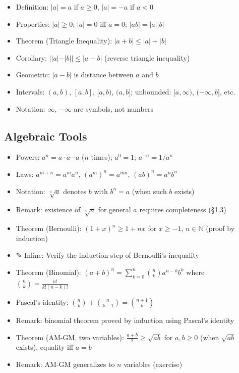 \documentclass[
  10pt,
  letterpaper,
]{scrbook}
\providecommand{\tightlist}{%
  \setlength{\itemsep}{0pt}\setlength{\parskip}{0pt}}
\newcommand{\NN}{\mathbb{N}}
\begin{document}
\begin{itemize}
\tightlist
\item
  Definition: \(|a| = a\) if \(a \geq 0\), \(|a| = -a\) if \(a < 0\)
\item
  Properties: \(|a| \geq 0\); \(|a| = 0\) iff \(a = 0\);
  \(|ab| = |a||b|\)
\item
  Theorem (Triangle Inequality): \(|a + b| \leq |a| + |b|\)
\item
  Corollary: \(||a| - |b|| \leq |a - b|\) (reverse triangle inequality)
\item
  Geometric: \(|a - b|\) is distance between \(a\) and \(b\)
\item
  Intervals: \((a, b)\), \([a, b]\), \([a, b)\), \((a, b]\); unbounded:
  \([a, \infty)\), \((-\infty, b]\), etc.
\item
  Notation: \(\infty\), \(-\infty\) are symbols, not numbers
\end{itemize}

\subsection{Algebraic Tools}\label{algebraic-tools}

\begin{itemize}
\tightlist
\item
  Powers: \(a^n = a \cdot a \cdots a\) (\(n\) times); \(a^0 = 1\);
  \(a^{-n} = 1/a^n\)
\item
  Laws: \(a^{m+n} = a^m a^n\), \((a^m)^n = a^{mn}\),
  \((ab)^n = a^n b^n\)
\item
  Notation: \(\sqrt[n]{a}\) denotes \(b\) with \(b^n = a\) (when such
  \(b\) exists)
\item
  Remark: existence of \(\sqrt[n]{a}\) for general \(a\) requires
  completeness (§1.3)
\item
  Theorem (Bernoulli): \((1 + x)^n \geq 1 + nx\) for \(x \geq -1\),
  \(n \in \NN\) (proof by induction)
\item
  ✎ Inline: Verify the induction step of Bernoulli's inequality
\item
  Theorem (Binomial):
  \((a + b)^n = \sum_{k=0}^{n} \binom{n}{k} a^{n-k} b^k\) where
  \(\binom{n}{k} = \frac{n!}{k!(n-k)!}\)
\item
  Pascal's identity: \(\binom{n}{k} + \binom{n}{k-1} = \binom{n+1}{k}\)
\item
  Remark: binomial theorem proved by induction using Pascal's identity
\item
  Theorem (AM-GM, two variables): \(\frac{a+b}{2} \geq \sqrt{ab}\) for
  \(a, b \geq 0\) (when \(\sqrt{ab}\) exists), equality iff \(a = b\)
\item
  Remark: AM-GM generalizes to \(n\) variables (exercise)
\end{itemize}
\end{document}
